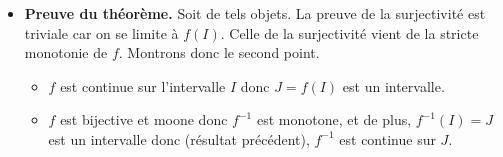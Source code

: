 \documentclass{article}
\begin{document}
\begin{question_kholle}
\begin{itemize}[label=$\vartriangleright$]
\begin{itemize}[label=$\star$]
\begin{itemize}
			            \end{itemize}
			            par conséquent, $y\notin f(I)$.\\
			            Ainsi, $\ell_{g}=f(x_{0})$ et on montre de même que $f(x_{0})=\ell_{d}$ si bien que nous pouvons conclure que $f$ est continue en $x_{0}$.\\
			      \item Supposons à présent que $x_{0}$ est un bord de $I$. Il suffit d’adapter la preuve ci-dessus en ne considérant que l’intervalle contenant $I$ à choisir entre $[x_{0},+\infty[$ et $]-\infty,x_{0}]$.
		      \end{itemize}

		\item \textbf{Preuve du théorème.} Soit de tels objets. La preuve de la surjectivité est triviale car on se limite à $f(I)$. Celle de la surjectivité vient de la stricte monotonie de $f$. Montrons donc le second point.
		      \begin{itemize}
			      \item $f$ est continue sur l’intervalle $I$ donc $J=f(I)$ est un intervalle.
			      \item $f$ est bijective et moone donc $f^{-1}$ est monotone, et de plus, $f^{-1}(I)=J$ est un intervalle donc (résultat précédent), $f^{-1}$ est continue sur $J$.
		      \end{itemize}
	\end{itemize}
\end{question_kholle}
\end{document}
